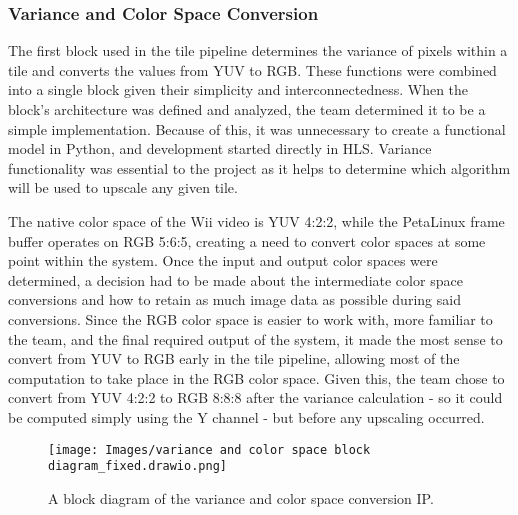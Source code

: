 \documentclass{article}
\newcounter{subsubsubsection}[subsubsection]
\begin{document}
            \subsubsection{Variance and Color Space Conversion}
                    \noindent The first block used in the tile pipeline determines the variance of pixels within a tile and converts the values from YUV to RGB. These functions were combined into a single block given their simplicity and interconnectedness. When the block’s architecture was defined and analyzed, the team determined it to be a simple implementation. Because of this, it was unnecessary to create a functional model in Python, and development started directly in HLS. Variance functionality was essential to the project as it helps to determine which algorithm will be used to upscale any given tile. 
                    \par The native color space of the Wii video is YUV 4:2:2, while the PetaLinux frame buffer operates on RGB 5:6:5, creating a need to convert color spaces at some point within the system. Once the input and output color spaces were determined, a decision had to be made about the intermediate color space conversions and how to retain as much image data as possible during said conversions. Since the RGB color space is easier to work with, more familiar to the team, and the final required output of the system, it made the most sense to convert from YUV to RGB early in the tile pipeline, allowing most of the computation to take place in the RGB color space. Given this, the team chose to convert from YUV 4:2:2 to RGB 8:8:8 after the variance calculation - so it could be computed simply using the Y channel - but before any upscaling occurred.

                    \begin{figure}[!tb] 
                    \centering
                    \texttt{[image: Images/variance and color space block diagram\_fixed.drawio.png]} 
                    \caption{A block diagram of the variance and color space conversion IP.}
                    \label{fig:variance_func} 
                    \end{figure}
\end{document}
